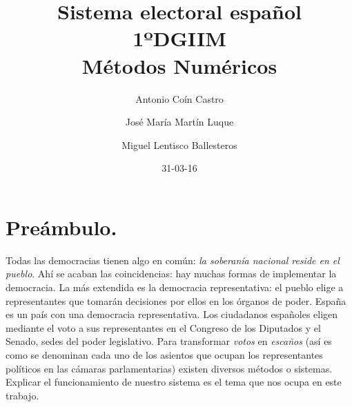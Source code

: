 \documentclass[11pt]{article}
\begin{document}
	\title{
		Sistema electoral español\\
		\vspace*{1\baselineskip}
		\large 1ºDGIIM \\
		Métodos Numéricos 
		\vspace*{1\baselineskip}
	} 
	
	\date{31-03-16}
	\author{Antonio Coín Castro \and José María Martín Luque \and Miguel Lentisco Ballesteros}
	
	
	
	\vfill
	
	\thispagestyle{empty}
	\fontsize{11}{14}
	
	\newpage
	
	\textsf{\tableofcontents}
	
	\newpage
	
	\section*{Preámbulo.}
	
	Todas las democracias tienen algo en común: \textit{la soberanía nacional reside en el pueblo}. Ahí se acaban las coincidencias: hay muchas formas de implementar la democracia. La más extendida es la democracia representativa: el pueblo elige a representantes que tomarán decisiones por ellos en los órganos de poder. España es un país con una democracia representativa. Los ciudadanos españoles eligen mediante el voto a sus representantes en el Congreso de los Diputados y el Senado, sedes del poder legislativo. Para transformar \textit{votos} en \textit{escaños} (así es como se denominan cada uno de los asientos que ocupan los representantes políticos en las cámaras parlamentarias) existen diversos métodos o sistemas. Explicar el funcionamiento de nuestro sistema es el tema que nos ocupa en este trabajo.
	
\end{document}
